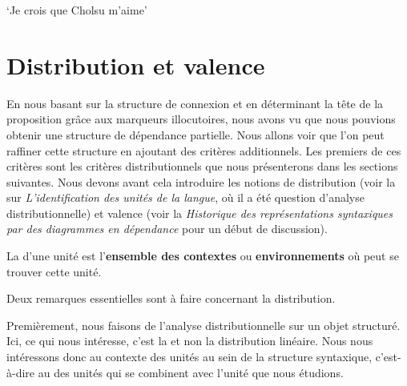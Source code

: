 {\begin{enumerate}
    \ea
    \glt   ‘Je crois que Cholsu m’aime’
    \z
    \z
    \end{enumerate}
}
\section{Distribution et valence}\label{sec:3.3.10}

En nous basant sur la structure de connexion et en déterminant la tête de la proposition grâce aux marqueurs illocutoires, nous avons vu que nous pouvions obtenir une structure de dépendance partielle. Nous allons voir que l’on peut raffiner cette structure en ajoutant des critères additionnels. Les premiers de ces critères sont les critères distributionnels que nous présenterons dans les sections suivantes. Nous devons avant cela introduire les notions de distribution (voir la  sur \textit{L’identification des unités de la langue}, où il a été question d’analyse distributionnelle) et valence (voir la  \textit{Historique des représentations syntaxiques par des diagrammes en dépendance} pour un début de discussion).

\begin{styleLivreImportant}
La  d’une unité est l’\textbf{ensemble des contextes} ou \textbf{environnements} où peut se trouver cette unité.
\end{styleLivreImportant}

Deux remarques essentielles sont à faire concernant la distribution.

Premièrement, nous faisons de l’analyse distributionnelle sur un objet structuré. Ici, ce qui nous intéresse, c’est la  et non la distribution linéaire. Nous nous intéressons donc au contexte des unités au sein de la structure syntaxique, c’est-à-dire au  des unités qui se combinent avec l’unité que nous étudions.

